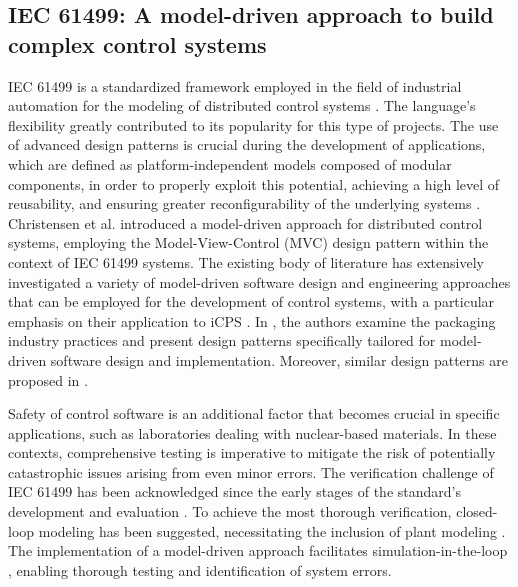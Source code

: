 \documentclass{ieeeojies}
\begin{document}
\subsection{IEC 61499: A model-driven approach to build complex control systems}
IEC 61499 \cite{iec61499} is a standardized framework employed in the field of industrial automation for the modeling of distributed control systems \cite{drozdov2021}. The language's flexibility greatly contributed to its popularity for this type of projects. 
The use of advanced design patterns is crucial during the development of applications, which are defined as platform-independent models composed of modular components, in order to properly exploit this potential, achieving a high level of reusability, and ensuring greater reconfigurability of the underlying systems \cite{sonnleithner2021iec}.
Christensen et al. \cite{christensen2000design} introduced a model-driven approach for distributed control systems, employing the Model-View-Control (MVC) design pattern \cite{Model-view-controller} within the context of IEC 61499 systems. 
The existing body of literature has extensively investigated a variety of model-driven software design and engineering approaches that can be employed for the development of control systems, with a particular emphasis on their application to iCPS \cite{sandeep2018}.
In \cite{bonfe2013design}, the authors examine the packaging industry practices and present design patterns specifically tailored for model-driven software design and implementation. Moreover, similar design patterns are proposed in \cite{cengic2006framework, vyatkin2005architecture, hametner2010automation}.

Safety of control software is an additional factor that becomes crucial in specific applications, such as laboratories dealing with nuclear-based materials.
In these contexts, comprehensive testing is imperative to mitigate the risk of potentially catastrophic issues arising from even minor errors. 
The verification challenge of IEC 61499 has been acknowledged since the early stages of the standard's development and evaluation \cite{vyatkin1999modeling,hanisch2009one}. To achieve the most thorough verification, closed-loop modeling has been suggested, necessitating the inclusion of plant modeling \cite{vyatkin2008closed}. The implementation of a model-driven approach facilitates simulation-in-the-loop \cite{hegny2010iec, yang2012transformation}, enabling thorough testing and identification of system errors. 
\end{document}
